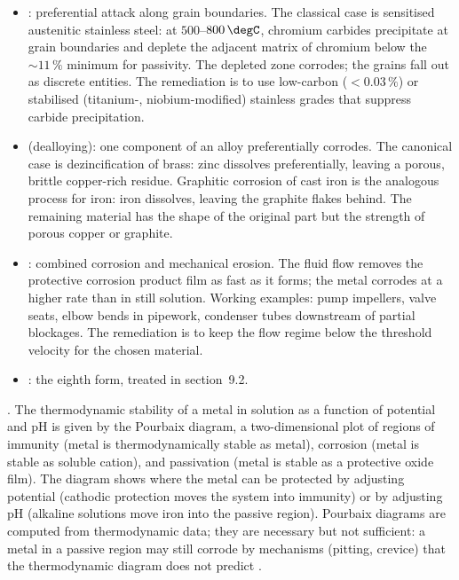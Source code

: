 \begin{itemize}[leftmargin=*]
  inside the pit drive the pit deeper). The working threat is that
  the pit may penetrate the wall thickness with little loss of mass;
  inspection by mass loss alone will miss the failure.
\item {}: preferential attack along
  grain boundaries. The classical case is sensitised austenitic
  stainless steel: at $500$--$800\,\degC$, chromium carbides
  precipitate at grain boundaries and deplete the adjacent matrix of
  chromium below the $\sim 11\,\%$ minimum for passivity. The depleted
  zone corrodes; the grains fall out as discrete entities. The
  remediation is to use low-carbon ($< 0.03\,\%$) or stabilised
  (titanium-, niobium-modified) stainless grades that suppress
  carbide precipitation.
\item {} (dealloying): one component of an
  alloy preferentially corrodes. The canonical case is dezincification
  of brass: zinc dissolves preferentially, leaving a porous, brittle
  copper-rich residue. Graphitic corrosion of cast iron is the
  analogous process for iron: iron dissolves, leaving the graphite
  flakes behind. The remaining material has the shape of the original
  part but the strength of porous copper or graphite.
\item {}: combined corrosion and mechanical
  erosion. The fluid flow removes the protective corrosion product
  film as fast as it forms; the metal corrodes at a higher rate than
  in still solution. Working examples: pump impellers, valve seats,
  elbow bends in pipework, condenser tubes downstream of partial
  blockages. The remediation is to keep the flow regime below the
  threshold velocity for the chosen material.
\item {}: the eighth form, treated in
  section~9.2.
\end{itemize}

. The thermodynamic stability of a metal
in solution as a function of potential and pH is given by the Pourbaix
diagram, a two-dimensional plot of regions of immunity (metal is
thermodynamically stable as metal), corrosion (metal is stable as
soluble cation), and passivation (metal is stable as a protective
oxide film). The diagram shows where the metal can be protected by
adjusting potential (cathodic protection moves the system into
immunity) or by adjusting pH (alkaline solutions move iron into the
passive region). Pourbaix diagrams are computed from thermodynamic
data; they are necessary but not sufficient: a metal in a passive
region may still corrode by mechanisms (pitting, crevice) that the
thermodynamic diagram does not predict \cite[ch.~2]{text:jones-corrosion}.

